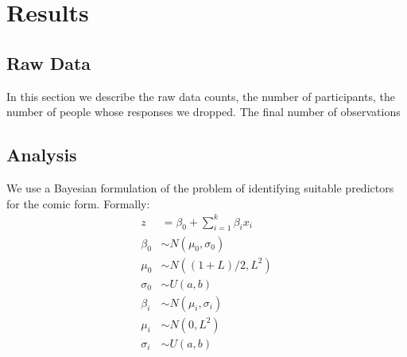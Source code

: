 
\section{Results}
\label{sec:Results}

\subsection{Raw Data}
\label{sub:Raw Data}
In this section we describe the raw data counts, the number of participants, the number of people whose responses we dropped. The final number of observations

\subsection{Analysis}
\label{sub:Analysis}
We use a Bayesian formulation of the problem of identifying suitable predictors for the comic form. Formally:
\begin{align}
z  &= \beta_0 + \sum_{i=1}^k \beta_i x_i  \\
\beta_0 &\sim N(\mu_0, \sigma_0) \\
\mu_0 &\sim N((1+L)/2, L^2) \\
\sigma_0 &\sim U(a,b)\\
\beta_i &\sim  N(\mu_i, \sigma_i)\\
\mu_i &\sim N(0, L^2) \\
\sigma_i &\sim U(a,b)
\end{align}
